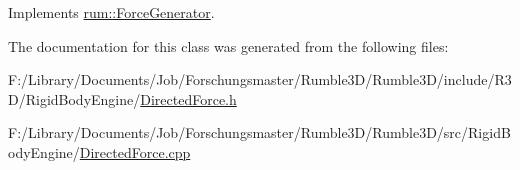 Implements \hyperlink{classrum_1_1_force_generator_a6b038c9a39e4cf64b2dcf2741804a824}{rum\+::\+Force\+Generator}.



The documentation for this class was generated from the following files\+:\begin{DoxyCompactItemize}
\item 
F\+:/\+Library/\+Documents/\+Job/\+Forschungsmaster/\+Rumble3\+D/\+Rumble3\+D/include/\+R3\+D/\+Rigid\+Body\+Engine/\hyperlink{_directed_force_8h}{Directed\+Force.\+h}\item 
F\+:/\+Library/\+Documents/\+Job/\+Forschungsmaster/\+Rumble3\+D/\+Rumble3\+D/src/\+Rigid\+Body\+Engine/\hyperlink{_directed_force_8cpp}{Directed\+Force.\+cpp}\end{DoxyCompactItemize}
